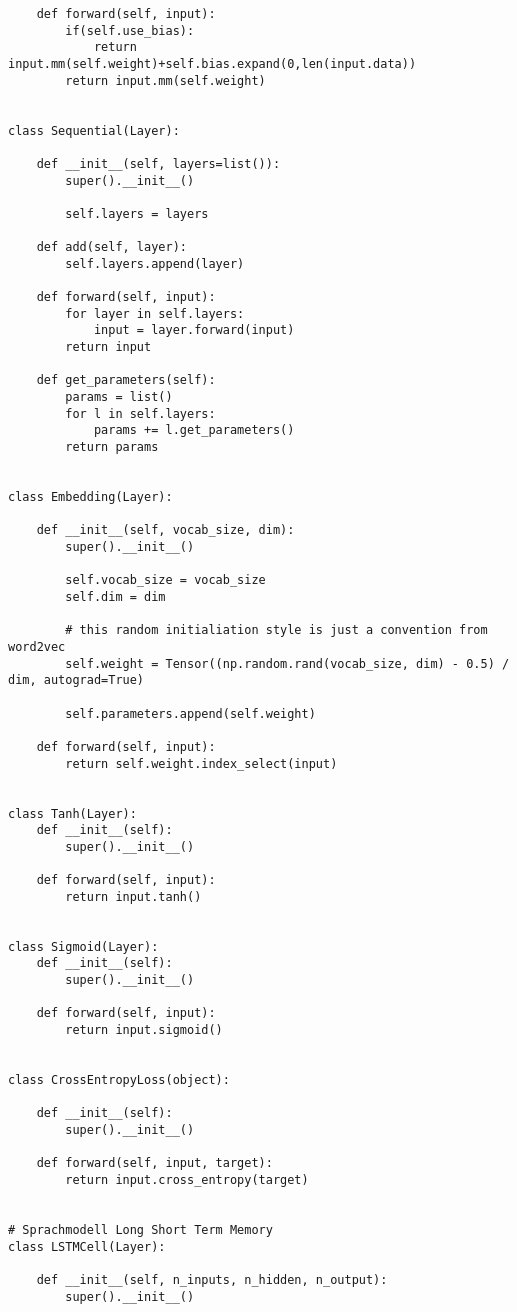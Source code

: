 \documentclass[12pt]{article}
\begin{document}
\begin{verbatim}
    def forward(self, input):
        if(self.use_bias):
            return input.mm(self.weight)+self.bias.expand(0,len(input.data))
        return input.mm(self.weight)


class Sequential(Layer):
    
    def __init__(self, layers=list()):
        super().__init__()
        
        self.layers = layers
    
    def add(self, layer):
        self.layers.append(layer)
        
    def forward(self, input):
        for layer in self.layers:
            input = layer.forward(input)
        return input
    
    def get_parameters(self):
        params = list()
        for l in self.layers:
            params += l.get_parameters()
        return params


class Embedding(Layer):
    
    def __init__(self, vocab_size, dim):
        super().__init__()
        
        self.vocab_size = vocab_size
        self.dim = dim
        
        # this random initialiation style is just a convention from word2vec
        self.weight = Tensor((np.random.rand(vocab_size, dim) - 0.5) / dim, autograd=True)
        
        self.parameters.append(self.weight)
    
    def forward(self, input):
        return self.weight.index_select(input)


class Tanh(Layer):
    def __init__(self):
        super().__init__()
    
    def forward(self, input):
        return input.tanh()


class Sigmoid(Layer):
    def __init__(self):
        super().__init__()
    
    def forward(self, input):
        return input.sigmoid()
    

class CrossEntropyLoss(object):
    
    def __init__(self):
        super().__init__()
    
    def forward(self, input, target):
        return input.cross_entropy(target)

    
# Sprachmodell Long Short Term Memory
class LSTMCell(Layer):
    
    def __init__(self, n_inputs, n_hidden, n_output):
        super().__init__()


\end{verbatim}
\end{document}
